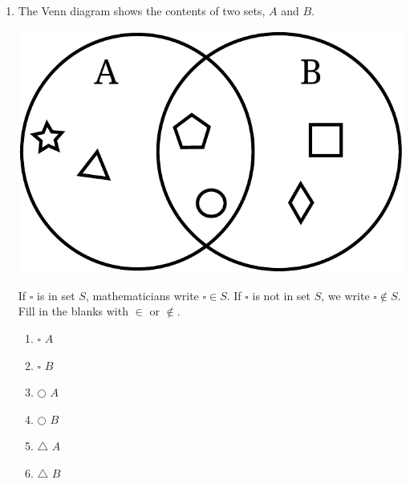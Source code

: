 \documentclass{tufte-book}
\begin{document}
\begin{enumerate}
  \item The Venn diagram shows the contents of two sets, $A$ and $B$.
  \begin{marginfigure}\includegraphics[width=\textwidth]{maths/fig/venn_sets.pdf}\end{marginfigure}
  If $\square$ is in set $S$, mathematicians write $\square \in S$. If $\square$ is not in set $S$, we write $\square \notin S$.
  Fill in the blanks with $\in$ or $\notin$.
  \begin{multicols}{4}
  \begin{enumerate}
    \item $\square$ \dotfill $A$\bigskip
    \item $\square$ \dotfill $B$\bigskip
    \item $\bigcirc$ \dotfill $A$\bigskip
    \item $\bigcirc$ \dotfill $B$\bigskip
    \item $\triangle$ \dotfill $A$\bigskip
    \item $\triangle$ \dotfill $B$\bigskip
  \end{enumerate}
  \end{multicols}
\end{enumerate}
\end{document}

